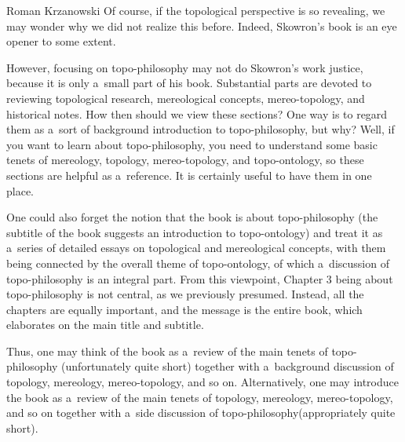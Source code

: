 \begin{newrevengenv}{Roman Krzanowski}
Of course, if the topological perspective is so revealing, we may wonder why we did not realize this before. Indeed, Skowron's book is an eye opener to some extent.



However, focusing on topo-philosophy may not do Skowron's work justice, because it is only a~small part of his book. Substantial parts are devoted to reviewing topological research, mereological concepts, mereo-topology, and historical notes. How then should we view these sections? One way is to regard them as a~sort of background introduction to topo-philosophy, but why? Well, if you want to learn about topo-philosophy, you need to understand some basic tenets of mereology, topology, mereo-topology, and topo-ontology, so these sections are helpful as a~reference. It is certainly useful to have them in one place.



One could also forget the notion that the book is about topo-philosophy (the subtitle of the book suggests an introduction to topo-ontology) and treat it as a~series of detailed essays on topological and mereological concepts, with them being connected by the overall theme of topo-ontology, of which a~discussion of topo-philosophy is an integral part. From this viewpoint, Chapter 3 being about topo-philosophy is not central, as we previously presumed. Instead, all the chapters are equally important, and the message is the entire book, which elaborates on the main title and subtitle.



Thus, one may think of the book as a~review of the main tenets of topo-philosophy (unfortunately quite short) together with a~background discussion of topology, mereology, mereo-topology, and so on. Alternatively, one may introduce the book as a~review of the main tenets of topology, mereology, mereo-topology, and so on together with a~side discussion of topo-philosophy(appropriately quite short).




\end{newrevengenv}
